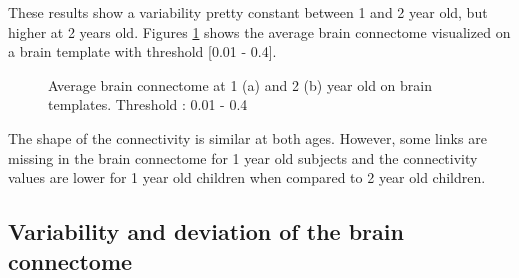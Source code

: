 \documentclass[]{spie}  %
\begin{document}
These results show a variability pretty constant between 1 and 2 year old, but higher at 2 years old.
Figures \ref{fig:AverageBrainConnectomeBrainTemplate} shows the average brain connectome visualized on a brain template with threshold [0.01 - 0.4].

\begin{figure}
\centering 
{}
\caption[Average brain connectome at 1 (a) and 2 (b) year old on brain templates ]{Average brain connectome at 1 (a) and 2 (b) year old on brain templates. Threshold : 0.01 - 0.4}
\label{fig:AverageBrainConnectomeBrainTemplate}
\end{figure} 

The shape of the connectivity is similar at both ages. However, some links are missing in the brain connectome for 1 year old subjects and the connectivity values are lower for 1 year old children when compared to 2 year old children.

\subsection{Variability and deviation of the brain connectome}
\end{document}

